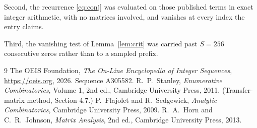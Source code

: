 \documentclass[11pt,a4paper]{article}
\theoremstyle{plain}
\theoremstyle{definition}
\begin{document}
Second, the recurrence \eqref{eq:conj} was evaluated on those published terms in exact
integer arithmetic, with no matrices involved, and vanishes at every index the entry claims.

Third, the vanishing test of Lemma~\ref{lem:crit} was carried past $S=256$ consecutive
zeros rather than to a sampled prefix.

\begin{thebibliography}{9}
 The OEIS Foundation, \emph{The On-Line Encyclopedia of Integer
Sequences}, \url{https://oeis.org}, 2026. Sequence A305582.
 R.~P.~Stanley, \emph{Enumerative Combinatorics}, Volume 1, 2nd ed.,
Cambridge University Press, 2011. (Transfer-matrix method, Section 4.7.)
 P.~Flajolet and R.~Sedgewick, \emph{Analytic Combinatorics}, Cambridge
University Press, 2009.
 R.~A.~Horn and C.~R.~Johnson, \emph{Matrix Analysis}, 2nd ed., Cambridge
University Press, 2013.
\end{thebibliography}
\end{document}
